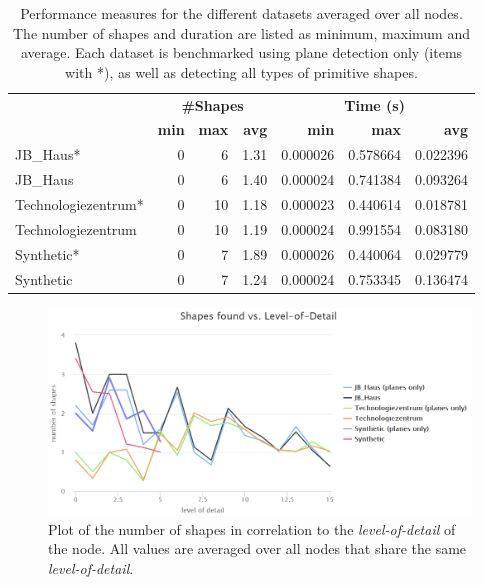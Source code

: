 \begin{table}
	\centering
	\begin{tabular}{ l || r | r | r || r | r | r}
			&\multicolumn{3}{c||}{\textbf{\#Shapes}} & \multicolumn{3}{c}{\textbf{Time (s)}}\\
			&\textbf{min} & \textbf{max} & \textbf{avg}  & \textbf{min} & \textbf{max} & \textbf{avg}  \\
			\hline
			JB\_Haus*							& 0 & 6  & 1.31 & 0.000026 & 0.578664 & 0.022396 \\
			JB\_Haus 							& 0 & 6  & 1.40 & 0.000024 & 0.741384 & 0.093264 \\
			Technologiezentrum*		& 0 & 10 & 1.18 & 0.000023 & 0.440614 & 0.018781 \\
			Technologiezentrum 		& 0 & 10 & 1.19 & 0.000024 & 0.991554 & 0.083180 \\
			Synthetic*						& 0 & 7  & 1.89 & 0.000026 & 0.440064 & 0.029779 \\
			Synthetic 						& 0 & 7  & 1.24 & 0.000024 & 0.753345 & 0.136474 \\
		\end{tabular}
	\caption{Performance measures for the different datasets averaged over all nodes. The number of shapes and duration are listed as minimum, maximum and average. Each dataset is benchmarked using plane detection only (items with *), as well as detecting all types of primitive shapes. }
	\label{table:schnabel_benchmarks}
\end{table}

\begin{figure}[h]
    \centering
    \includegraphics[width=1\textwidth]{Results/shapes_vs_lod.png}
    \caption{Plot of the number of shapes in correlation to the \textit{level-of-detail} of the node. All values are averaged over all nodes that share the same \textit{level-of-detail}.}
    \label{fig:shapes_vs_lod}
\end{figure}

